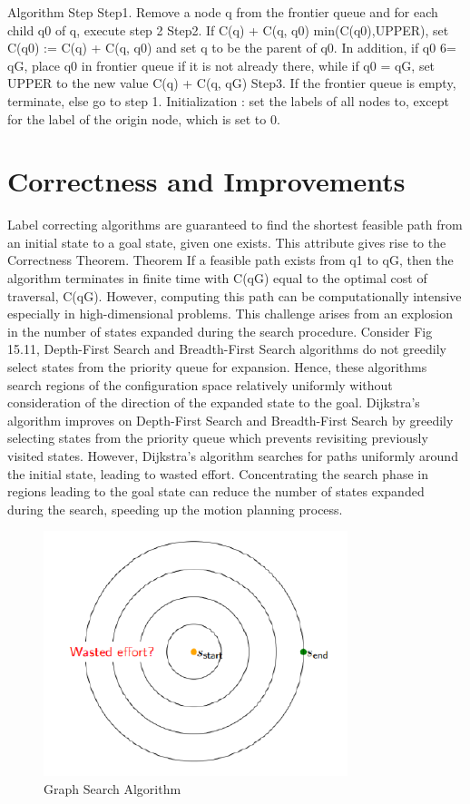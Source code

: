 \documentclass[twoside]{article}
\begin{document}
Algorithm Step
Step1. Remove a node q from the frontier queue and for each child q0 of q, execute step 2
Step2. If C(q) + C(q, q0) min(C(q0),UPPER), set C(q0) := C(q) + C(q, q0) and set q to be the parent of q0. In addition, if q0 6= qG, place q0 in frontier queue if it is not already there, while if q0 = qG, set UPPER to the new value C(q) + C(q, qG)
Step3. If the frontier queue is empty, terminate, else go to step 1.
Initialization : set the labels of all nodes to, except for the label of the origin node, which is set to 0.

\section{Correctness and Improvements}
Label correcting algorithms are guaranteed to find the shortest feasible path from an initial state to a goal state, given one exists. This attribute gives rise to the Correctness Theorem.
Theorem If a feasible path exists from q1 to qG, then the algorithm terminates in finite time with C(qG) equal to the optimal cost of traversal, C(qG).
However, computing this path can be computationally intensive especially in high-dimensional problems. This challenge arises from an explosion in the number of states expanded during the search procedure. Consider Fig 15.11, Depth-First Search and Breadth-First Search algorithms do not greedily select states from the priority queue for expansion. Hence, these algorithms search regions of the configuration space
relatively uniformly without consideration of the direction of the expanded state to the goal. Dijkstra’s algorithm improves on Depth-First Search and Breadth-First Search by greedily selecting states from the priority queue which prevents revisiting previously visited states. However, Dijkstra’s algorithm searches for paths uniformly around the initial state, leading to wasted effort. Concentrating the search phase in regions leading to the goal state can reduce the number of states expanded during the search, speeding up the motion planning process.

\begin{figure}[h]
\begin{center}
\includegraphics{fig15_11.PNG}
\caption{Graph Search Algorithm}
\end{center}
\end{figure}
\end{document}
